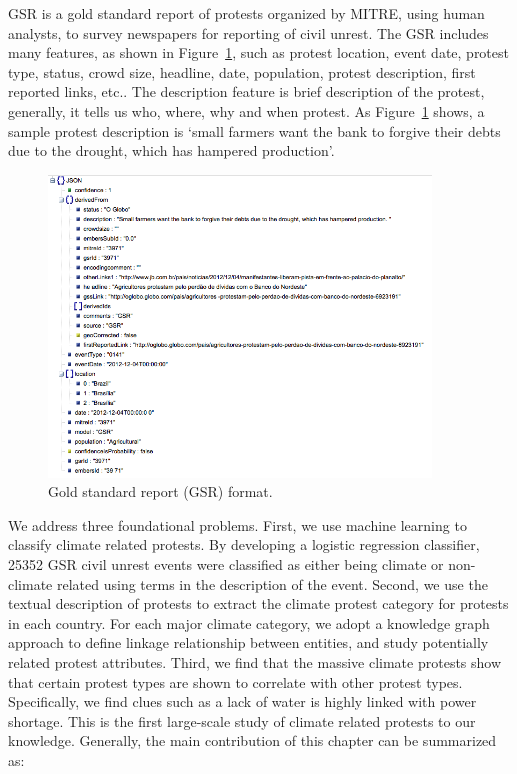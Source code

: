 GSR is a gold standard report of protests organized by MITRE, using human analysts, to survey newspapers for reporting of civil unrest. The GSR includes many features, as shown in Figure~\ref{GSR}, such as protest location, event date, protest type, status, crowd size, headline, date, population, protest description, first reported links, etc.. The description feature is brief description of the protest, generally, it tells us who, where, why and when protest. As Figure~\ref{GSR} shows, a sample protest description is `small farmers want the bank to forgive their debts due to the drought, which has hampered production'.

\begin{figure}[th]
\centerline
{\includegraphics[width = 4in]{figures/gsr_event_json.png}}
\caption{Gold standard report (GSR) format.}
\label{GSR}
\end{figure}


We address three foundational problems. First, we use machine learning to classify climate related protests. By developing a logistic regression classifier, 25352 GSR civil unrest events were classified as either being climate or non-climate related using terms in the description of the event. Second, we use the textual description of protests to extract the climate protest category for protests in each country. For each major climate category, we adopt a knowledge graph approach to define linkage relationship between entities, and study potentially related protest attributes. Third, we find that the massive climate protests show that certain protest types are shown to correlate with other protest types. Specifically, we find clues such as a lack of water is highly linked with power shortage. This is the first large-scale study of climate related protests to our knowledge. Generally, the main contribution of this chapter can be summarized as:


